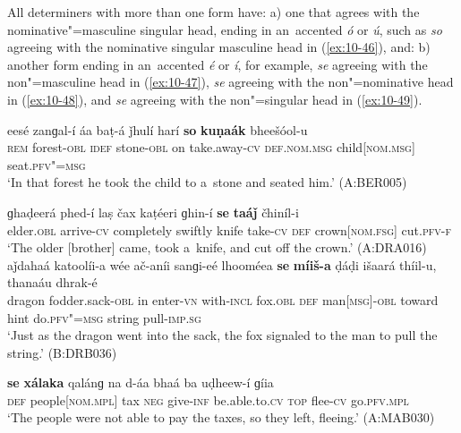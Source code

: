All determiners with more than one form have: a) one that agrees with the nominative"=masculine singular head, ending in an~accented \textit{ó} or \textit{ú}, such as \textit{so} agreeing with the nominative singular masculine head in (\ref{ex:10-46}), and: b) another form ending in an~accented \textit{é} or \textit{í}, for example, \textit{se} agreeing with the non"=masculine head in (\ref{ex:10-47}), \textit{se} agreeing with the non"=nominative head in (\ref{ex:10-48}), and \textit{se} agreeing with the non"=singular head in (\ref{ex:10-49}).
\begin{exe}
\ex
\label{ex:10-46}
\gll eesé zanɡal-í áa baṭ-á ǰhulí harí \textbf{so} \textbf{kuṇaák} bheešóol-u\\
\textsc{rem} forest-\textsc{obl} \textsc{idef} stone-\textsc{obl} on take.away-\textsc{cv}  \textsc{def.nom.msg} child[\textsc{nom.msg}] seat.\textsc{pfv"=msg}\\
\glt `In that forest he took the child to a~stone and seated him.' (A:BER005)

\ex
\label{ex:10-47}
\gll ɡhaḍeerá phed-í laṣ čax kaṭéeri ɡhin-í \textbf{se} \textbf{taáǰ} čhiníl-i \\
elder.\textsc{obl} arrive-\textsc{cv} completely swiftly knife take-\textsc{cv}  \textsc{def} crown[\textsc{nom.fsg}] cut.\textsc{pfv-f}\\
\glt `The older [brother] came, took a~knife, and cut off the crown.' (A:DRA016)
\ex
\label{ex:10-48}
\gll aǰdahaá katoolíi-a wée ač-aníi sanɡi-eé lhooméea \textbf{se} \textbf{míiš-a} ḍáḍi išaará thíil-u, thanaáu dhrak-é\\
dragon fodder.sack-\textsc{obl} in enter-\textsc{vn} with-\textsc{incl} fox.\textsc{obl} \textsc{def} man\textsc{[msg]}-\textsc{obl} toward hint do.\textsc{pfv"=msg} string pull-\textsc{imp.sg}\\
\glt `Just as the dragon went into the sack, the fox signaled to the man to pull the string.' (B:DRB036)

\ex
\label{ex:10-49}
\gll \textbf{se} \textbf{xálaka} qalánɡ na d-áa bhaá ba uḍheew-í ɡíia \\
\textsc{def} people[\textsc{nom.mpl}] tax \textsc{neg} give-\textsc{inf} be.able.to.\textsc{cv}  \textsc{top} flee-\textsc{cv} go.\textsc{pfv.mpl}  \\
\glt `The people were not able to pay the taxes, so they left, fleeing.' (A:MAB030)
\end{exe}

